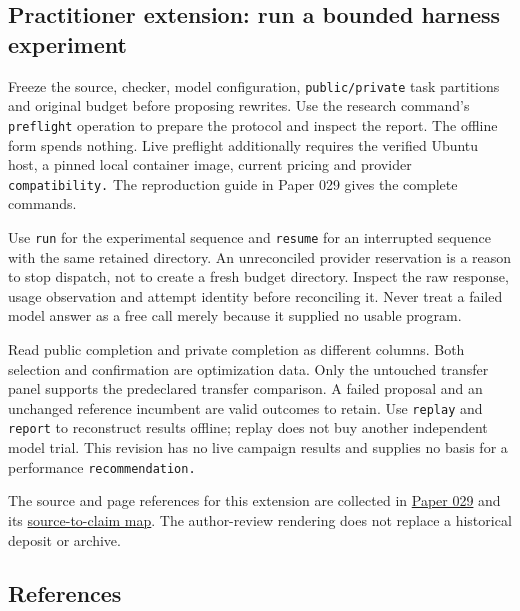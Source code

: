 \documentclass[
  11pt,
]{article}
\newcommand{\passthrough}[1]{#1}
\begin{document}
\subsection{Practitioner extension: run a bounded harness
experiment}\label{practitioner-extension-run-a-bounded-harness-experiment}

Freeze the source, checker, model configuration,
\nolinkurl{public/private} task partitions and original budget before
proposing rewrites. Use the research command's
\passthrough{\lstinline!preflight!} operation to prepare the protocol
and inspect the report. The offline form spends nothing. Live preflight
additionally requires the verified Ubuntu host, a pinned local container
image, current pricing and provider \nolinkurl{compatibility.} The
reproduction guide in Paper 029 gives the complete commands.

Use \passthrough{\lstinline!run!} for the experimental sequence and
\passthrough{\lstinline!resume!} for an interrupted sequence with the
same retained directory. An unreconciled provider reservation is a
reason to stop dispatch, not to create a fresh budget directory. Inspect
the raw response, usage observation and attempt identity before
reconciling it. Never treat a failed model answer as a free call merely
because it supplied no usable program.

Read public completion and private completion as different columns. Both
selection and confirmation are optimization data. Only the untouched
transfer panel supports the predeclared transfer comparison. A failed
proposal and an unchanged reference incumbent are valid outcomes to
retain. Use \passthrough{\lstinline!replay!} and
\passthrough{\lstinline!report!} to reconstruct results offline; replay
does not buy another independent model trial. This revision has no live
campaign results and supplies no basis for a performance
\nolinkurl{recommendation.}

The source and page references for this extension are collected in
\href{../029/paper.pdf}{Paper 029} and its
\href{../029/docs/source_to_claim_map.md}{source-to-claim map}. The
author-review rendering does not replace a historical deposit or
archive.

\subsection{References}\label{references}
\end{document}
